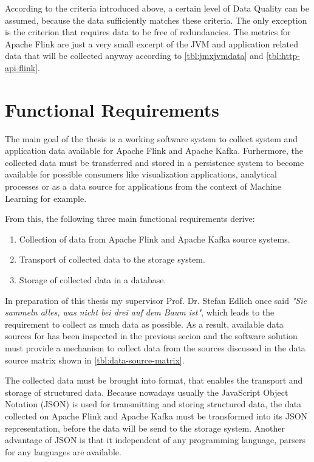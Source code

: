 According to the criteria introduced above, a certain level of Data Quality can be assumed, because the data sufficiently
matches these criteria. The only exception is the criterion that requires data to be free of redundancies. The metrics
for Apache Flink are just a very small excerpt of the JVM and application related data that will be collected anyway according
to \autoref{tbl:jmxjvmdata} and \autoref{tbl:http-api-flink}.

\section{Functional Requirements}
\label{sec:fr}
The main goal of the thesis is a working software system to collect system and application data available
for Apache Flink and Apache Kafka. Furhermore, the collected data must be transferred and stored in a
persistence system to become available for possible consumers like visualization applications,
analytical processes or as a data source for applications from the context of Machine Learning
for example.

From this, the following three main functional requirements derive:
\begin{enumerate}
    \item Collection of data from Apache Flink and Apache Kafka source systems.
    \item Transport of collected data to the storage system.
    \item Storage of collected data in a database.
\end{enumerate}

In preparation of this thesis my supervisor Prof. Dr. Stefan Edlich once said \textit{"Sie sammeln
alles, was nicht bei drei auf dem Baum ist"}, which leads to the requirement to collect as much data
as possible. As a result, available data sources for has been inspected in the previous secion and the
software solution must provide a mechanism to collect data from the sources discussed in the data source
matrix shown in \autoref{tbl:data-source-matrix}.

The collected data must be brought into format, that enables the transport and storage of structured data.
Because nowadays usually the JavaScript Object Notation (JSON) is used for transmitting and storing
structured data, the data collected on Apache Flink and Apache Kafka must be transformed into its JSON
representation, before the data will be send to the storage system. Another advantage of JSON is
that it independent of any programming language, parsers for any languages are available.

